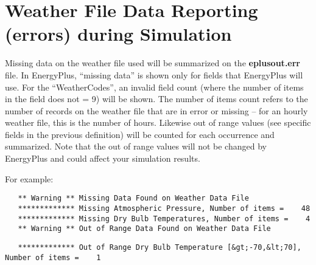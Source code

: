 \section{Weather File Data Reporting (errors) during Simulation}\label{weather-file-data-reporting-errors-during-simulation}

Missing data on the weather file used will be summarized on the \textbf{eplusout.err} file. In EnergyPlus, ``missing data'' is shown only for fields that EnergyPlus will use. For the ``WeatherCodes'', an invalid field count (where the number of items in the field does not = 9) will be shown. The number of items count refers to the number of records on the weather file that are in error or missing -- for an hourly weather file, this is the number of hours. Likewise out of range values (see specific fields in the previous definition) will be counted for each occurrence and summarized. Note that the out of range values will not be changed by EnergyPlus and could affect your simulation results.

For example:

\begin{lstlisting}
   ** Warning ** Missing Data Found on Weather Data File
   ************* Missing Atmospheric Pressure, Number of items =    48
   ************* Missing Dry Bulb Temperatures, Number of items =    4
   ** Warning ** Out of Range Data Found on Weather Data File
\end{lstlisting}

\begin{lstlisting}
   ************* Out of Range Dry Bulb Temperature [&gt;-70,&lt;70], Number of items =    1
\end{lstlisting}